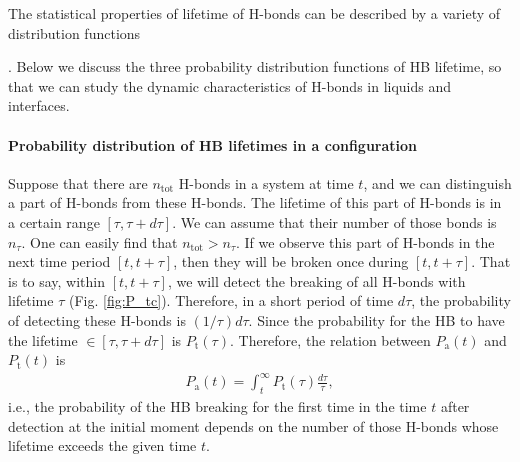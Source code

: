 The statistical properties of lifetime of H-bonds can be described by a variety of distribution functions{\cite{Rapaport1983, Tanaka1983, Geiger1984,Naberukhin2009}.
Below we discuss the three probability distribution functions of HB lifetime, so that we can study the dynamic characteristics of H-bonds in liquids and interfaces.

\paragraph{Probability distribution of HB lifetimes in a configuration}\label{P_tc}
Suppose that there are $n_\text{tot}$ H-bonds in a system at time $t$, and we can distinguish a part of H-bonds from these H-bonds. 
The lifetime of this part of H-bonds is in a certain range $[\tau, \tau + d\tau]$. We can assume that their number of those bonds is $n_\tau$. 
One can easily find that $n_\text{tot}>n_\tau$. If we observe this part of H-bonds in the next time period $[t, t+\tau]$, 
then they will be broken once during $[t, t+\tau]$. 
That is to say, within $[t,t+\tau]$, we will detect the breaking of all H-bonds with lifetime $\tau$ (Fig. \ref{fig:P_tc}).  
Therefore, in a short period of time $d\tau$, the probability of detecting these H-bonds is $(1/\tau)d\tau$.
Since the probability for the HB to have the lifetime $\in [\tau,\tau+d\tau]$ is $P_\text{t}(\tau)$. 
Therefore, the relation between $P_\text{a}(t)$ and $P_\text{t}(t)$ is
\begin{eqnarray}
P_\text{a}(t) = \int_t^\infty P_\text{t}(\tau)\frac{d\tau}{\tau},
\label{eq:Pt_and_P}
\end{eqnarray}
i.e., the probability of the HB breaking for the first time in the time $t$ after detection at the initial moment depends on 
the number of those H-bonds whose lifetime exceeds the given time $t$\cite{Voloshin2009}.
\begin{figure}
\centering
{}
\end{figure}}
